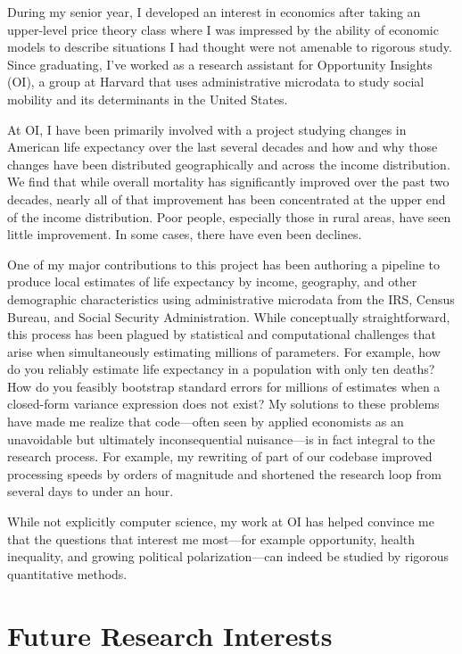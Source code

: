 \documentclass{grad-statement}
\begin{document}
During my senior year, I developed an interest in economics after taking an upper-level price theory class where I was impressed by the ability of economic models to describe situations I had thought were not amenable to rigorous study.
Since graduating, I've worked as a research assistant for Opportunity Insights (OI), a group at Harvard that uses administrative microdata to study social mobility and its determinants in the United States.

At OI, I have been primarily involved with a project studying changes in American life expectancy over the last several decades and how and why those changes have been distributed geographically and across the income distribution.
We find that while overall mortality has significantly improved over the past two decades, nearly all of that improvement has been concentrated at the upper end of the income distribution.
Poor people, especially those in rural areas, have seen little improvement.
In some cases, there have even been declines.

One of my major contributions to this project has been authoring a pipeline to produce local estimates of life expectancy by income, geography, and other demographic characteristics using administrative microdata from the IRS, Census Bureau, and Social Security Administration.
While conceptually straightforward, this process has been plagued by statistical and computational challenges that arise when simultaneously estimating millions of parameters.
For example, how do you reliably estimate life expectancy in a population with only ten deaths?
How do you feasibly bootstrap standard errors for millions of estimates when a closed-form variance expression does not exist?
My solutions to these problems have made me realize that code---often seen by applied economists as an unavoidable but ultimately inconsequential nuisance---is in fact integral to the research process.
For example, my rewriting of part of our codebase improved processing speeds by orders of magnitude and shortened the research loop from several days to under an hour.

While not explicitly computer science, my work at OI has helped convince me that the questions that interest me most---for example opportunity, health inequality, and growing political polarization---can indeed be studied by rigorous quantitative methods.

\section{Future Research Interests}
\end{document}
